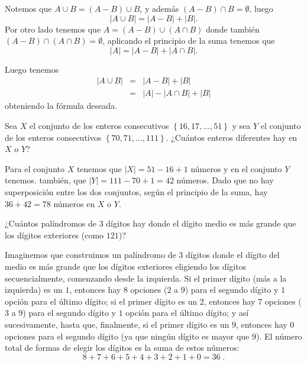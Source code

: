 \begin{solucion}
Notemos que $A \cup B = (A-B)\cup B$, y además $(A-B) \cap B = \emptyset$, luego $$|A\cup B|=|A-B|+|B|.$$ Por otro lado tenemos que $A= (A-B)\cup (A\cap B) $ donde también $(A-B)\cap (A\cap B)=\emptyset$, aplicando el principio de la suma tenemos que $$|A|=|A-B|+|A\cap B|.$$

Luego tenemos 
\begin{eqnarray*}
|A\cup B| & = &  |A-B|+|B|\\
&=& |A|-|A\cap B|+|B|
\end{eqnarray*}
obteniendo la fórmula deseada.
\end{solucion}

\begin{ejemplo}
Sea $X$ el conjunto de los enteros consecutivos $\left\{16,17,\ldots,51\right\}$ y sea $Y$ el conjunto de los enteros consecutivos $\left\{70,71,\ldots,111\right\}$. ¿Cuántos enteros diferentes hay en $X$ o $Y$?
\end{ejemplo}
\begin{solucion}
Para el conjunto $X$ tenemos que $|X|=51-16+1$ números y en el conjunto $Y$ tenemos. también, que $|Y|=111-70+1=42$ números. Dado que no hay superposición entre los dos conjuntos, según el principio de la suma, hay $36 + 42 = 78$ números en $X$ o $Y$.
\end{solucion}

\begin{ejemplo}
¿Cuántos palíndromos de $3$ dígitos hay donde el dígito medio es más grande que los dígitos exteriores (como $121$)?
\end{ejemplo}

\begin{solucion}
Imaginemos que construimos un palíndromo de $3$ dígitos donde el dígito del medio es más grande que los dígitos exteriores eligiendo los dígitos secuencialmente, comenzando desde la izquierda. Si el primer dígito (más a la izquierda) es un $1$, entonces hay $8$ opciones ($2$ a $9$) para el segundo dígito y $1$ opción para el último dígito; si el primer dígito es un $2$, entonces hay $7$ opciones ($3$ a $9$) para el segundo dígito y $1$ opción para el último dígito; y así sucesivamente, hasta que, finalmente, si el primer dígito es un $9$, entonces hay $0$ opciones para el segundo dígito (ya que ningún dígito es mayor que $9$). El número total de formas de elegir los dígitos es la suma de estos números:
\[8+7+6+5+4+3+2+1+0=36\;.\]
\end{solucion}

